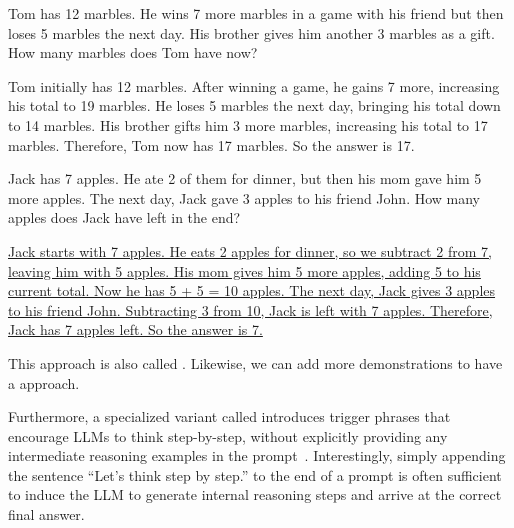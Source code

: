 \vspace{0.5em}
\begin{tcolorbox}
\begin{center}
\parbox{0.9\textwidth}
{

{\color{ugreen} Tom has 12 marbles. He wins 7 more marbles in a game with his friend but then loses 5 marbles the next day. His brother gives him another 3 marbles as a gift. How many marbles does Tom have now?}

\vspace{0.3em}

{\color{ugreen} Tom initially has 12 marbles. After winning a game, he gains 7 more, increasing his total to 19 marbles. He loses 5 marbles the next day, bringing his total down to 14 marbles. His brother gifts him 3 more marbles, increasing his total to 17 marbles. Therefore, Tom now has 17 marbles. So the answer is 17.}

\vspace{0.3em}

{\color{blue} Jack has 7 apples. He ate 2 of them for dinner, but then his mom gave him 5 more apples. The next day, Jack gave 3 apples to his friend John. How many apples does Jack have left in the end?}

\vspace{0.3em}

\uline{Jack starts with 7 apples. He eats 2 apples for dinner, so we subtract 2 from 7, leaving him with 5 apples. His mom gives him 5 more apples, adding 5 to his current total. Now he has 5 + 5 = 10 apples. The next day, Jack gives 3 apples to his friend John. Subtracting 3 from 10, Jack is left with 7 apples. Therefore, Jack has 7 apples left. So the answer is 7.}

}
\end{center}
\end{tcolorbox}
\vspace{0.5em}

This approach is also called . Likewise, we can add more demonstrations to have a  approach.

Furthermore, a specialized variant called  introduces trigger phrases that encourage LLMs to think step-by-step, without explicitly providing any intermediate reasoning examples in the prompt~\cite{kojima-etal:2022large}. Interestingly, simply appending the sentence ``Let's think step by step.'' to the end of a prompt is often sufficient to induce the LLM to generate internal reasoning steps and arrive at the correct final answer.

